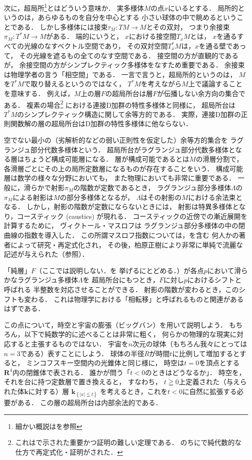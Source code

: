 \documentclass[11pt, a4paper, dvipdfmx]{jlreq}
\theoremstyle{definition}
\newcommand{\rr}{\mathbf{R}}
\theoremstyle{mystyle}
\numberwithin{equation}{section} %
\newcommand{\bk}{\mathbf{k}}
\begin{document}
次に，超局所\footnote{細かい概説は\cite{Sch21}を参照}とはどういう意味か．
実多様体$M$の点$x$にいるとする．
局所的というのは，あらゆるものを自分を中心とする
小さい球体の中で眺めるということである．
しかし多様体には接束$\tau_M\colon TM\to M$とその双対，
つまり余接束$\pi_M\colon T^{\ast}M\to M$がある．
端的にいうと，
$x$における接空間$T_xM$とは，
$x$を通るすべての光線のなすベクトル空間であり，
その双対空間$T^{\ast}_xM$は，$x$を通る壁であって，
その光線を遮るもの全てのなす空間である．
接空間の方が直観的であるが，
余接空間の方がシンプレクティック多様体をなすため重要である．
余接束は物理学者の言う「相空間」である．
一言で言うと，超局所的というのは，
$M$を$T^{\ast}M$で取り替えるというのではなく，
$T^{\ast}M$を考えながら$M$上で議論することを意味する．
例えば，$M$上の層$F$の超局所台は層$F$が伝播しない余方向の集合である．
複素の場合\footnote{
    これは\cite{SKK73}で示された重要かつ証明の難しい定理である．
    のちに\cite{Gab81}で純代数的な仕方で再定式化・証明がされた．
    }
における連接D加群の特性多様体と同様に，
超局所台は$T^{\ast}M$のシンプレクティック構造に関して余等方的である．
実際，連接D加群の正則関数解の層の超局所台はD加群の特性多様体に他ならない．

空でない最小の（劣解析的などの弱い正則性を仮定した）余等方的集合を
ラグランジュ部分代数多様体という．
超局所台がラグランジュ部分代数多様体となる層はちょうど構成可能層になる．
層が構成可能であるとは$M$の滑層分割で，
各滑層ごとにその上の局所定数層になるものが存在することをいう．
構成可能層は数学の様々な分野においても，
また物理においても非常に重要である．
一般に，滑らかで射影$\pi_M$の階数が定数であるとき，
ラグランジュ部分多様体$\Lambda$の$\pi_M$による射影は$M$の部分多様体となるが，
$\Lambda$はその射影の$M$における余法束となる．
しかし，射影の階数が定数にならないときには，
射影は特異多様体となり，コースティック (caustics) が現れる．
コースティックの近傍での漸近展開を計算するために，
ヴィクトール・マスロフ\cite{Mas65}は
ラグランジュ部分多様体の中の閉曲線の指数を導入した．
この所謂マスロフ指数については，\cite{Arn67,Ler76}を含む
何人かの著者によって研究・再定式化され，
その後，柏原正樹により非常に単純で流麗な記述が与えられた（\cite[Appendix]{KS90}参照）．

「純層」$F$（ここでは説明しない．\cite[\S 7.5]{KS90}を
挙げるにとどめる．）が各点$p$において滑らかなラグランジュ多様体$\Lambda$を
超局所台にもつとき，$F$に対し$p$におけるシフトと呼ばれる
半整数を対応させることができる．
射影の階数が変わるとき，このシフトも変わる．
これは物理学における「相転移」と呼ばれるものと関連があるはずである．

この点について，時空と宇宙の膨張（ビッグバン）を用いて説明しよう．
もちろん，以下で純数学的に述べることは非常に粗く，
何らかの物理的な現実に対応すると主張するものではない．
宇宙を$n$次元の球体（もちろん我々にとっては$n=3$である）表すことにしよう．
球体の半径$R$が時間$t$に比例して増加するとすると，
ミンコフスキー空間内の光錐体と同じ様に，
時空は$t=0$を頂点とする$\rr^4$内の閉錐体で表される．
誰かが問う「$t<0$のときはどうなるか」．
時空を，それを台に持つ定数層で置き換えると，
すなわち，
$t\geqq 0$上定義された（与えられた体$\bk$に対する）層
$\bk_{\left\{\lvert x\rvert\leqq t\right\}}$
を考えるとき，これを$t<0$に自然に拡張する必要がある．
この層の超局所台は内部余法的である．
\end{document}
